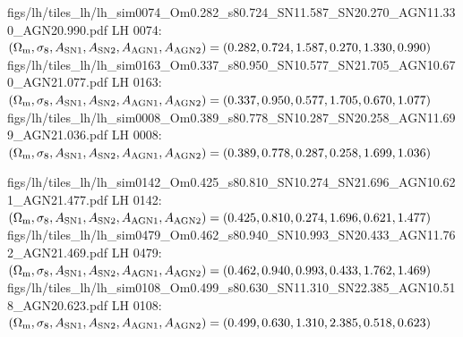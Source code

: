\documentclass[usenatbib]{mnras}
\newcommand{\Om}{\Omega_{\rm m}}
\newcommand{\sig}{\sigma_8}
\begin{document}
\clearpage
\begin{center}
\vspace*{\fill}
\AppendixLHTile
  {figs/lh/tiles_lh/lh_sim0074_Om0.282_s80.724_SN11.587_SN20.270_AGN11.330_AGN20.990.pdf}
  {LH 0074: $(\Om,\sig,A_{\rm SN1},A_{\rm SN2},A_{\rm AGN1},A_{\rm AGN2})
  =(0.282,0.724,1.587,0.270,1.330,0.990)$}
\AppendixLHTile
  {figs/lh/tiles_lh/lh_sim0163_Om0.337_s80.950_SN10.577_SN21.705_AGN10.670_AGN21.077.pdf}
  {LH 0163: $(\Om,\sig,A_{\rm SN1},A_{\rm SN2},A_{\rm AGN1},A_{\rm AGN2})
  =(0.337,0.950,0.577,1.705,0.670,1.077)$}
\AppendixLHTile
  {figs/lh/tiles_lh/lh_sim0008_Om0.389_s80.778_SN10.287_SN20.258_AGN11.699_AGN21.036.pdf}
  {LH 0008: $(\Om,\sig,A_{\rm SN1},A_{\rm SN2},A_{\rm AGN1},A_{\rm AGN2})
  =(0.389,0.778,0.287,0.258,1.699,1.036)$}
\vspace*{\fill}
\end{center}

\clearpage
\begin{center}
\vspace*{\fill}
\AppendixLHTile
  {figs/lh/tiles_lh/lh_sim0142_Om0.425_s80.810_SN10.274_SN21.696_AGN10.621_AGN21.477.pdf}
  {LH 0142: $(\Om,\sig,A_{\rm SN1},A_{\rm SN2},A_{\rm AGN1},A_{\rm AGN2})
  =(0.425,0.810,0.274,1.696,0.621,1.477)$}
\AppendixLHTile
  {figs/lh/tiles_lh/lh_sim0479_Om0.462_s80.940_SN10.993_SN20.433_AGN11.762_AGN21.469.pdf}
  {LH 0479: $(\Om,\sig,A_{\rm SN1},A_{\rm SN2},A_{\rm AGN1},A_{\rm AGN2})
  =(0.462,0.940,0.993,0.433,1.762,1.469)$}
\AppendixLHTile
  {figs/lh/tiles_lh/lh_sim0108_Om0.499_s80.630_SN11.310_SN22.385_AGN10.518_AGN20.623.pdf}
  {LH 0108: $(\Om,\sig,A_{\rm SN1},A_{\rm SN2},A_{\rm AGN1},A_{\rm AGN2})
  =(0.499,0.630,1.310,2.385,0.518,0.623)$}
\vspace*{\fill}
\end{center}


\end{document}
